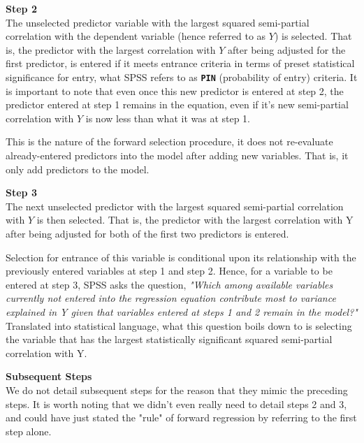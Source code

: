 \documentclass[a4paper,12pt]{article}
\begin{document}
\textbf{Step 2}\\
The unselected predictor variable with the largest squared semi-partial correlation with the dependent variable (hence referred to as $Y$) is selected. That is, the predictor with the largest correlation with $Y$ after being adjusted for the first predictor, is entered if it meets entrance criteria in terms of preset statistical significance for entry, what SPSS refers to as
\textbf{\texttt{PIN}} (probability of entry) criteria. 
It is important to note that even once this new predictor is entered at step 2, the predictor entered at step 1 remains in the equation, even if it's new semi-partial correlation with $Y$ is now less than what it was at step 1. 

This is the nature of the forward selection procedure, it does not re-evaluate already-entered predictors into the model after adding new variables. That is, it only add predictors to the model. 

\textbf{Step 3}\\
The next unselected predictor with the largest squared semi-partial correlation with $Y$ is then selected. That is, the predictor with the largest correlation with Y after being adjusted for both of the first two predictors is entered. 

Selection for entrance of this variable is conditional upon its relationship with the previously entered variables at step 1 and step 2. Hence, for a variable to be entered at step 3, SPSS asks the question, \textit{"Which among available variables currently not entered into the regression equation contribute most to variance explained in Y given that variables entered at steps 1 and 2 remain in the model?"} Translated into statistical language, what this question boils down to is selecting the variable that has the largest statistically significant squared semi-partial correlation with Y.

\textbf{Subsequent Steps } \\
We do not detail subsequent steps for the reason that they mimic the preceding steps. It is worth noting that we didn't even really need to detail steps 2 and 3, and could have just stated the "rule" of forward regression by referring to the first step alone. 
\end{document}
